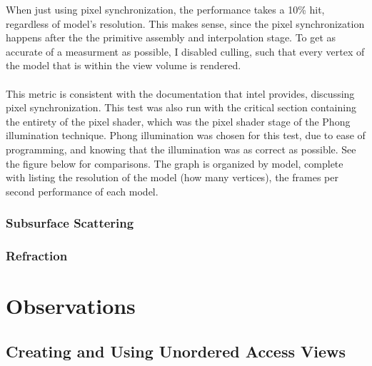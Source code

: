 \documentclass[a4paper, 12pt]{article}
\begin{document}
When just using pixel synchronization, the performance takes a 10\% hit,
regardless of model's resolution. This makes sense, since the pixel
synchronization happens after the the primitive assembly and interpolation
stage. To get as accurate of a measurment as possible, I disabled culling,
such that every vertex of the model that is within the view volume is
rendered. \\ \\ This metric is consistent with the documentation that intel
provides, discussing pixel synchronization. This test was also run with the
critical section containing the entirety of the pixel shader, which was the
pixel shader stage of the Phong illumination technique. Phong illumination was
chosen for this test, due to ease of programming, and knowing that the
illumination was as correct as possible. See the figure below for comparisons.
The graph is organized by model, complete with listing the resolution of the
model (how many vertices), the frames per second performance of each model.

\subsubsection{Subsurface Scattering}

\lipsum[24-38]

\subsubsection{Refraction}

\lipsum[39-53]

\section{Observations}

\subsection{Creating and Using Unordered Access Views}
\label{section:UAVs}
\end{document}
